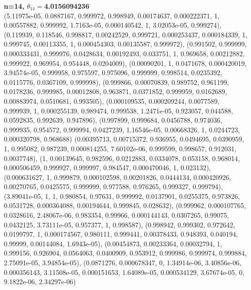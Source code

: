 \documentclass[12pt, a4paper]{extarticle}
\begin{document}
\begin{center}
{\bf\boldmath n=14, $\theta_{14}=$4.0156094236}\\
(5.11975e-05, 0.0887167, 0.999972, 0.998949, 0.00174637, 0.000222371, 1, 0.00557882, 0.999992, 1.7163e-05, 0.000140542, 1, 3.02053e-05, 0.999274),
(0.119939, 0.118546, 0.998817, 0.00242529, 0.999721, 0.000253437, 0.000184339, 1, 0.999745, 0.00113355, 1, 0.000454303, 0.00135587, 0.999972),
(0.991502, 0.999999, 0.000333431, 0.999976, 0.0428634, 0.00192493, 0.033751, 1, 0.969658, 0.00212882, 0.999922, 0.969954, 0.954448, 0.0204009),
(0.00090201, 1, 0.0471678, 0.000420019, 3.94574e-05, 0.999958, 0.975597, 0.975096, 0.999999, 0.998514, 0.0235392, 0.0115776, 0.0367109, 0.999998),
(0.999866, 0.00070839, 0.989752, 0.961199, 0.0178236, 0.999985, 0.00012808, 0.963871, 0.0371852, 0.999959, 0.0162689, 0.00883974, 0.0510681, 0.993505),
(0.000109535, 0.000209244, 0.0077589, 0.999939, 1, 0.000255139, 0.989474, 0.999538, 1.2471e-05, 0.923057, 0.044588, 0.0592835, 0.992639, 0.947896),
(0.997899, 0.999684, 0.0456788, 0.974036, 0.999935, 0.954572, 0.999994, 0.0427239, 1.16546e-05, 0.00668326, 1, 0.0244723, 0.000320798, 0.968688)
(0.00395713, 0.00715372, 0.936955, 0.0494695, 0.0390959, 1, 0.995082, 0.987239, 0.000814255, 7.60102e-06, 0.999599, 0.998657, 0.912031, 0.0037748),
(1, 0.00139645, 0.982596, 0.0212883, 0.0334078, 0.053158, 0.968014, 0.000506459, 0.999927, 0.999997, 0.984547, 0.000470046, 1, 0.023132),
(0.000631627, 1, 0.999879, 0.000102598, 0.00201826, 0.0444134, 0.000420926, 0.00270765, 0.0425575, 0.999999, 0.977588, 0.976265, 0.999327, 0.999794),
(3.89041e-05, 1, 1, 0.980854, 0.97631, 0.999992, 0.0137901, 0.0255375, 0.973826, 0.0531728, 0.000364088, 0.00194644, 0.999845, 0.028632),
(0.999962, 0.000107765, 0.0328616, 2.48067e-06, 0.983354, 0.99966, 0.000144143, 0.0307265, 0.99075, 0.0432125, 3.73111e-05, 0.957377, 1, 0.998587),
(0.998942, 0.999302, 0.972642, 0.0199797, 1, 0.000174567, 0.980111, 0.999441, 0.00378433, 0.948393, 0.040194, 0.99999, 0.00144084, 1.6943e-05),
(0.00454873, 0.00233364, 0.00032794, 1, 0.999156, 0.926904, 0.0564063, 0.0400909, 0.953912, 0.999986, 0.999974, 0.999884, 2.75091e-05, 3.94854e-05),
(0.0871276, 0.000678347, 0, 1.34914e-06, 3.40856e-06, 0.000356143, 3.11508e-05, 0.000151653, 1.64089e-05, 0.000534129, 3.67674e-05, 0, 9.1822e-06, 2.34297e-06)


\end{center}
\end{document}
